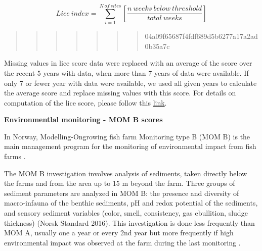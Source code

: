 \documentclass[
]{book}
\begin{document}
\begin{equation}
Lice \ index = \sum_{i = 1}^{N \ of \ sites}[\frac{n \ weeks\ below_ \ threshold}{total\ weeks}]
 \label{eq:lice}
\end{equation}

\begin{quote}
\begin{quote}
\begin{quote}
\begin{quote}
\begin{quote}
\begin{quote}
\begin{quote}
04a09f65687f4fdf689d5b6277a17a2ad0b35a7c
\end{quote}
\end{quote}
\end{quote}
\end{quote}
\end{quote}
\end{quote}
\end{quote}

Missing values in lice score data were replaced with an average of the score over the recent 5 years with data, when more than 7 years of data were available. If only 7 or fewer year with data were available, we used all given years to calculate the average score and replace missing values with this score.
For details on computation of the lice score, please follow this \href{https://ohi-norway.github.io/nor-prep/prep/food_provision/Mariculture/lice_count_at_localities.html}{link}.

\textbf{Environmentlal monitoring - MOM B scores}

In Norway, Modelling-Ongrowing fish farm Monitoring type B (MOM B) is the main management program for the monitoring of environmental impact from fish farms \citep{ervik1997regulating}.

The MOM B investigation involves analysis of sediments, taken directly below the farms and from the area up to 15 m beyond the farm. Three groups of sediment parameters are analyzed in MOM B: the presence and diversity of macro-infauna of the benthic sediments, pH and redox potential of the sediments, and sensory sediment variables (color, smell, consistency, gas ebullition, sludge thickness) (Norsk Standard 2016). This investigation is done less frequently than MOM A, usually one a year or every 2nd year but more frequently if high environmental impact was observed at the farm during the last monitoring \citep{norge2016miljoovervaaking}.
\end{document}
